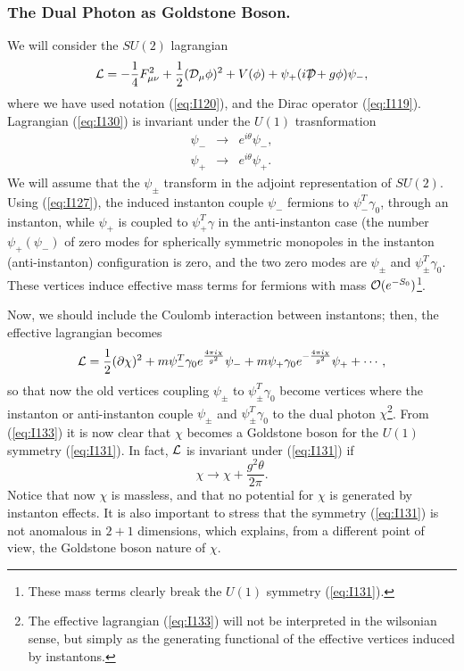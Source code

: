 \subsubsection{The Dual Photon as Goldstone Boson.}

We will consider the $SU(2)$ lagrangian 
\begin{equation}
{\cal L} = - \frac {1}{4} F_{\mu \nu} ^2 + \frac {1}{2} ({\cal
D}_{\mu} \phi)^2+ V(\phi) + \psi_+ (i {\cal D} \! \! \! \! / + g \phi 
)\psi_-,
\label{eq:I130}
\end{equation}
where we have used notation (\ref{eq:I120}), and the Dirac
operator (\ref{eq:I119}). Lagrangian (\ref{eq:I130}) is invariant
under the $U(1)$ trasnformation
\begin{eqnarray}
\psi_- & \rightarrow & e^{i \theta} \psi_-, \nonumber \\
\psi_+ & \rightarrow & e^{i \theta} \psi_+.
\label{eq:I131}
\end{eqnarray}
We will assume that the $\psi_{\pm}$ transform in the adjoint
representation of $SU(2)$. Using (\ref{eq:I127}), the induced
instanton couple $\psi_-$ fermions to $\psi_-^{T}\gamma_0$,
through an instanton, while $\psi_+$ is coupled to $\psi_+^T \gamma$ 
in the anti-instanton case (the number $\psi_+(\psi_-) $ of zero modes 
for spherically symmetric monopoles in the instanton (anti-instanton) 
configuration is zero, and the two zero modes are $\psi_{\pm}$
and $\psi_{\pm}^T\gamma_0$. These vertices induce effective mass
terms for fermions with mass ${\cal O}(e^{-S_0})$\footnote{These
mass terms clearly break the $U(1)$ symmetry (\ref{eq:I131}).}.
  
Now, we should include the Coulomb interaction between
instantons; then, the effective lagrangian becomes
\begin{equation}
{\cal L} = \frac {1}{2} (\partial \chi)^2+m \psi_-^T \gamma_0
e^{\frac {4\pi i \chi}{g^2}} \psi_- + m \psi_+ \gamma_0 e^{- \frac
{4 \pi i \chi}{g^2}} \psi_+ + \cdots,
\label{eq:I133}
\end{equation}
so that now the old vertices coupling $\psi_{\pm}$ to
$\psi_{\pm}^T \gamma_0$ become vertices where the instanton or
anti-instanton couple $\psi_{\pm}$ and $\psi_{\pm}^T \gamma_0$ to 
the dual photon $\chi$\footnote{The effective lagrangian
(\ref{eq:I133}) will not be interpreted in the wilsonian sense,
but simply as the generating functional of the effective vertices
induced by instantons.}. From (\ref{eq:I133}) it is now clear
that $\chi$ becomes a Goldstone boson for the $U(1)$ symmetry
\cite{AHW} (\ref{eq:I131}). In fact, ${\cal L}$ is invariant under
(\ref{eq:I131}) if 
\begin{equation}
\chi \rightarrow \chi + \frac {g^2 \theta}{2 \pi}.
\label{eq:I135}
\end{equation}
Notice that now $\chi$ is massless, and that no potential for
$\chi$ is generated by instanton effects. It is also important to
stress that the symmetry (\ref{eq:I131}) is not anomalous in
$2+1$ dimensions, which explains, from a different point of view,
the Goldstone boson nature of $\chi$.



